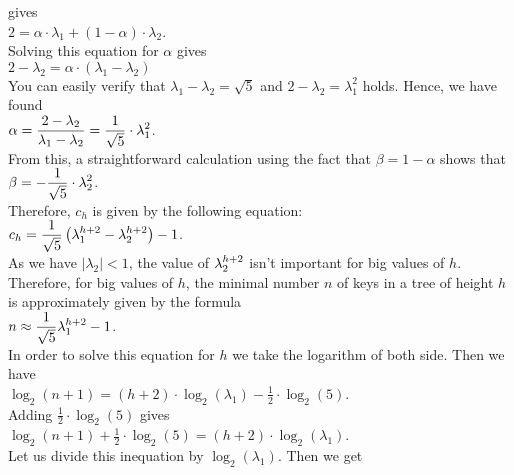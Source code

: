 gives
\\[0.2cm]
\hspace*{1.3cm}
$2 = \alpha \cdot \lambda_1 + (1-\alpha) \cdot \lambda_2$.
\\[0.2cm]
Solving this equation for $\alpha$ gives
\\[0.2cm]
\hspace*{1.3cm}
$2 - \lambda_2 = \alpha \cdot (\lambda_1 - \lambda_2)$
\\[0.2cm]
You can easily verify that $\lambda_1 - \lambda_2 = \sqrt{5}$ and $2 - \lambda_2 = \lambda_1^2$
holds.  Hence, we have found
\\[0.2cm]
\hspace*{1.3cm}
$\displaystyle \alpha = \frac{2 - \lambda_2}{\lambda_1 - \lambda_2} = \frac{1}{\sqrt{5}} \cdot \lambda_1^2$.
\\[0.2cm]
From this, a straightforward calculation using the fact that $\beta = 1 - \alpha$ shows that 
\\[0.2cm]
\hspace*{1.3cm}
$\displaystyle \beta  = -\frac{1}{\sqrt{5}} \cdot \lambda_2^2$.
\\[0.2cm]
Therefore, $c_h$ is given by the following equation:
\\[0.2cm]
\hspace*{1.3cm}
$c_h = \displaystyle \frac{1}{\sqrt{5}} \left( \lambda_1^{h+2} - \lambda_2^{h+2} \right) -
1$.  
\\[0.2cm]
As we have  $|\lambda_2| < 1$, the value of  $\displaystyle\lambda_2^{h+2}$ isn't important for big
values of $h$.  Therefore, for big values of $h$, the minimal number  $n$ of keys in a tree of
height  $h$ is approximately given by the formula \\[0.2cm]
\hspace*{1.3cm} $n \approx \displaystyle \frac{1}{\sqrt{5}} \lambda_1^{h+2} - 1$. \\[0.2cm]
In order to solve this equation for  $h$ we take the logarithm of both side.  Then we have
\\[0.2cm]
\hspace*{1.3cm}
$\log_2(n+1) = (h+2) \cdot \log_2(\lambda_1) - \frac{1}{2}\cdot \log_2(5)$.
\\[0.2cm]
Adding  $\frac{1}{2}\cdot \log_2(5)$ gives
\\[0.2cm]
\hspace*{1.3cm}
$\log_2(n+1) + \frac{1}{2}\cdot \log_2(5) = (h+2) \cdot \log_2(\lambda_1)$.
\\[0.2cm]
Let us divide this inequation by  $\log_2(\lambda_1)$.  Then we get
\\[0.4cm]
